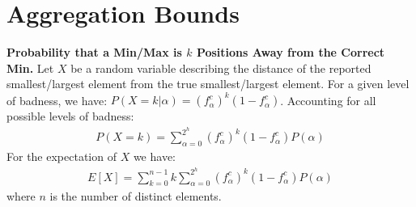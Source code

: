 \documentclass[10pt,twocolumn]{style}
\begin{document}


  \section{Aggregation Bounds}
  
  {\bf Probability that a Min/Max is $k$ Positions Away from the
  Correct Min.}
  Let $X$ be a random variable describing the distance of the reported
  smallest/largest element from the true smallest/largest element. For
  a given level of badness, we have: $P(X=k|\alpha) = (f_{\alpha}^c)^k(1-f_{\alpha}^c)$. Accounting for all
  possible levels of badness:
  \begin{eqnarray}
    P(X=k)=\sum_{\alpha=0}^{2^h}(f_{\alpha}^c)^k(1-f_{\alpha}^c)P(\alpha)
  \end{eqnarray}
  For the expectation of $X$ we have:
  \begin{eqnarray}
    E[X] = \sum_{k=0}^{n-1}k\sum_{\alpha=0}^{2^h}(f_{\alpha}^c)^k(1-f_{\alpha}^c)P(\alpha)
  \end{eqnarray}
  where $n$ is the number of distinct elements.
%
  
\end{document}

